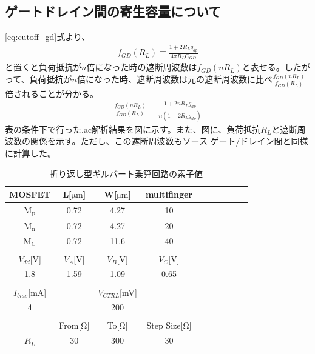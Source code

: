 \documentclass[twocolumn]{jsarticle}
\begin{document}
\subsection{ゲートドレイン間の寄生容量について}
    \eqref{eq:cutoff_gd}式より、
    \begin{align*}
        f_{GD}(R_{L})\equiv\frac{1+2R_{L}g_{dp}}{4\pi R_{L}C_{GD}}
    \end{align*}
    と置くと負荷抵抗が$n$倍になった時の遮断周波数は$f_{GD}(nR_{L})$と表せる。したがって、負荷抵抗が$n$倍になった時、遮断周波数は元の遮断周波数に比べ$\frac{f_{GD}(nR_{L})}{f_{GD}(R_{L})}$倍されることが分かる。
    \begin{align}
        \frac{f_{GD}(nR_{L})}{f_{GD}(R_{L})}=\frac{1+2nR_{L}g_{dp}}{n(1+2R_{L}g_{dp})} 
    \end{align}
    表の条件下で行った.ac解析結果を図に示す。また、図に、負荷抵抗$R_{L}$と遮断周波数の関係を示す。ただし、この遮断周波数もソース-ゲート/ドレイン間と同様に計算した。

    \begin{table}[h]
        \caption{折り返し型ギルバート乗算回路の素子値}
        \label{table:sim_gd}
        \centering
        \begin{tabular}{cccccccccc}
            MOSFET & L[$\mathrm{\mu m}$] & W[$\mathrm{\mu m}$] & multifinger\\
            \hline \hline
            $\mathrm{M_{p}}$ & 0.72 & 4.27 & 10 \\
            $\mathrm{M_{n}}$ & 0.72 & 4.27 & 20 \\
            $\mathrm{M_{C}}$ & 0.72 & 11.6 & 40 \\
            &&&\\
            $V_{dd}$[V] & $V_{A}$[V] & $V_{B}$[V] & $V_{C}$[V]\\
            \hline\hline
            1.8 & 1.59 & 1.09 & 0.65 \\
            &&&\\
            $I_{bias}$[mA] & & $V_{CTRL}$[mV] & \\
            \hline\hline
            4 & & 200 & \\
            &&&\\
            & From[$\mathrm{\Omega}$] & To[$\mathrm{\Omega}$] & Step Size[$\mathrm{\Omega}$]\\
            \hline\hline
            $R_{L}$ & 30 & 300 & 30
        \end{tabular}
    \end{table}
\end{document}
